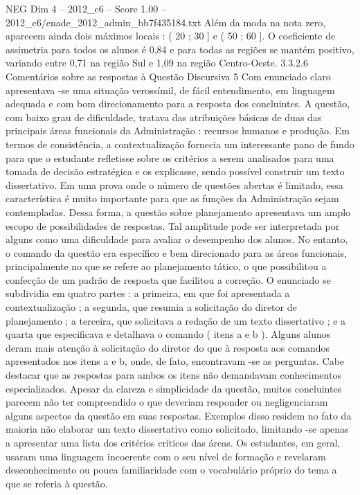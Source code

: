 \begin{textsample}{NEG Dim 4 – 2012\_c6 – Score 1.00 – 2012\_c6/enade\_2012\_admin\_bb7f435184.txt}
Além da moda na nota zero, aparecem ainda dois máximos locais : ( 20 ; 30 ] e ( 50 ; 60 ].
O coeficiente de assimetria para todos os alunos é 0,84 e para todas as regiões se mantém positivo, variando entre 0,71 na região Sul e 1,09 na região Centro-Oeste. 3.3.2.6 Comentários sobre as respostas à Questão Discursiva 5 Com enunciado claro apresentava -se uma situação verossímil, de fácil entendimento, em linguagem adequada e com bom direcionamento para a resposta dos concluintes.
A questão, com baixo grau de dificuldade, tratava das atribuições básicas de duas das principais áreas funcionais da Administração : recursos humanos e produção.
Em termos de consistência, a contextualização fornecia um interessante pano de fundo para que o estudante refletisse sobre os critérios a serem analisados para uma tomada de decisão estratégica e os explicasse, sendo possível construir um texto dissertativo.
Em uma prova onde o número de questões abertas é limitado, essa característica é muito importante para que as funções da Administração sejam contempladas.
Dessa forma, a questão sobre planejamento apresentava um amplo escopo de possibilidades de respostas.
Tal amplitude pode ser interpretada por alguns como uma dificuldade para avaliar o desempenho dos alunos.
No entanto, o comando da questão era específico e bem direcionado para as áreas funcionais, principalmente no que se refere ao planejamento tático, o que possibilitou a confecção de um padrão de resposta que facilitou a correção.
O enunciado se subdividia em quatro partes : a primeira, em que foi apresentada a contextualização ; a segunda, que resumia a solicitação do diretor de planejamento ; a terceira, que solicitava a redação de um texto dissertativo ; e a quarta que especificava e detalhava o comando ( itens a e b ).
Alguns alunos deram mais atenção à solicitação do diretor do que à resposta aos comandos apresentados nos itens a e b, onde, de fato, encontravam -se as perguntas.
Cabe destacar que as respostas para ambos os itens não demandavam conhecimentos especializados.
Apesar da clareza e simplicidade da questão, muitos concluintes parecem não ter compreendido o que deveriam responder ou negligenciaram alguns aspectos da questão em suas respostas.
Exemplos disso residem no fato da maioria não elaborar um texto dissertativo como solicitado, limitando -se apenas a apresentar uma lista dos critérios críticos das áreas.
Os estudantes, em geral, usaram uma linguagem incoerente com o seu nível de formação e revelaram desconhecimento ou pouca familiaridade com o vocabulário próprio do tema a que se referia à questão.

\end{textsample}
